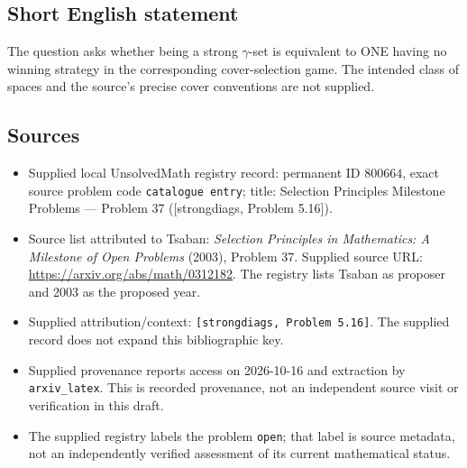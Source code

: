 \documentclass[11pt]{article}
\begin{document}
\subsection{Short English statement}
The question asks whether being a strong \(\gamma\)-set is equivalent to ONE having no winning strategy in the corresponding cover-selection game. The intended class of spaces and the source's precise cover conventions are not supplied.
\subsection{Sources}
\begin{itemize}
\item Supplied local UnsolvedMath registry record: permanent ID \(800664\), exact source problem code \texttt{catalogue entry}; title: Selection Principles Milestone Problems --- Problem 37 ([strongdiags, Problem 5.16]).
\item Source list attributed to Tsaban: \emph{Selection Principles in Mathematics: A Milestone of Open Problems} (2003), Problem 37. Supplied source URL: \url{https://arxiv.org/abs/math/0312182}. The registry lists Tsaban as proposer and 2003 as the proposed year.
\item Supplied attribution/context: \texttt{[strongdiags, Problem 5.16]}. The supplied record does not expand this bibliographic key.
\item Supplied provenance reports access on 2026-10-16 and extraction by \texttt{arxiv\_latex}. This is recorded provenance, not an independent source visit or verification in this draft.
\item The supplied registry labels the problem \texttt{open}; that label is source metadata, not an independently verified assessment of its current mathematical status.
\end{itemize}
\end{document}
